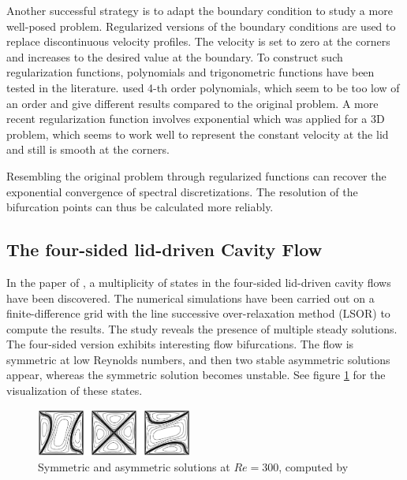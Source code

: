 Another successful strategy is to adapt the boundary condition to study a more
well-posed problem. Regularized versions of the boundary conditions are used to
replace discontinuous velocity profiles. The velocity is set to zero at the
corners and increases to the desired value at the boundary. To construct such
regularization functions, polynomials \citep{shen1991} and trigonometric
\citep{} functions have been tested in the literature. \cite{shen1991} used
4-th order polynomials, which seem to be too low of an order and give different
results compared to the original problem. A more recent regularization function
involves exponential \citep{lopez2017} which was applied for a 3D problem,
which seems to work well to represent the constant velocity at the lid and
still is smooth at the corners.

Resembling the original problem through regularized functions can recover the
exponential convergence of spectral discretizations. The resolution of the
bifurcation points can thus be calculated more reliably.  

\subsection{The four-sided lid-driven Cavity Flow} \label{sec:4sc}

In the paper of \cite{wahba2009}, a multiplicity of states in the four-sided
lid-driven cavity flows have been discovered. The numerical simulations have
been carried out on a finite-difference grid with the line successive
over-relaxation method (LSOR) to compute the results. The study reveals the
presence of multiple steady solutions. The four-sided version exhibits
interesting flow bifurcations. The flow is symmetric at low Reynolds numbers,
and then two stable asymmetric solutions appear, whereas the symmetric solution
becomes unstable. See figure \ref{fig:4fsc_states} for the visualization of
these states.

\begin{figure}[h!]
  \begin{center}
    \includegraphics[width=0.455\textwidth]{figs/fig_wahba2009}
  \end{center}
  \caption{Symmetric and asymmetric solutions at $Re=300$, computed by
    \cite{wahba2012}}
  \label{fig:4fsc_states}
\end{figure}

